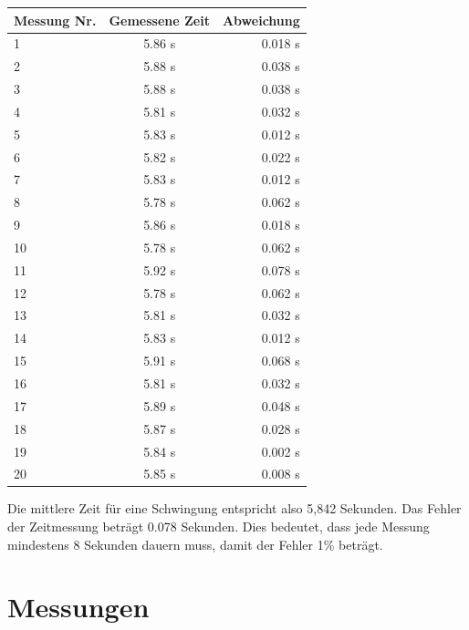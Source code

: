 \documentclass[12pt, a4paper, twoside]{article}
\begin{document}
      \begin{center}
    \begin{tabular}{l|c|r} %
      \textbf{Messung Nr.} & \textbf{Gemessene Zeit} & \textbf{Abweichung}\\
    
      \hline 
      1 & 5.86 s & 0.018 s \\
      2 & 5.88 s & 0.038 s \\
      3 & 5.88 s & 0.038 s \\
      4 & 5.81 s & 0.032 s \\
      5 & 5.83 s& 0.012 s \\
      6 & 5.82 s & 0.022 s \\
      7 & 5.83 s & 0.012 s \\
      8 & 5.78 s & 0.062 s \\
      9 & 5.86 s & 0.018 s \\
      10 & 5.78 s & 0.062 s \\
      11 & 5.92 s & 0.078 s \\
      12 & 5.78 s & 0.062 s \\
      13 & 5.81 s & 0.032 s \\
      14 & 5.83 s & 0.012 s \\
      15 & 5.91 s & 0.068 s \\
      16 & 5.81 s & 0.032 s \\
      17 & 5.89 s & 0.048 s \\
      18 & 5.87 s & 0.028 s \\
      19 & 5.84 s & 0.002 s \\
      20 & 5.85 s & 0.008 s \\

    \end{tabular}
  \end{center}
    Die mittlere Zeit für eine Schwingung entspricht also 5,842 Sekunden.
    Das Fehler der Zeitmessung beträgt 0.078 Sekunden. Dies bedeutet, dass jede Messung mindestens 8 Sekunden dauern muss, damit der Fehler 1\% beträgt.
    \section{Messungen}
\end{document}
